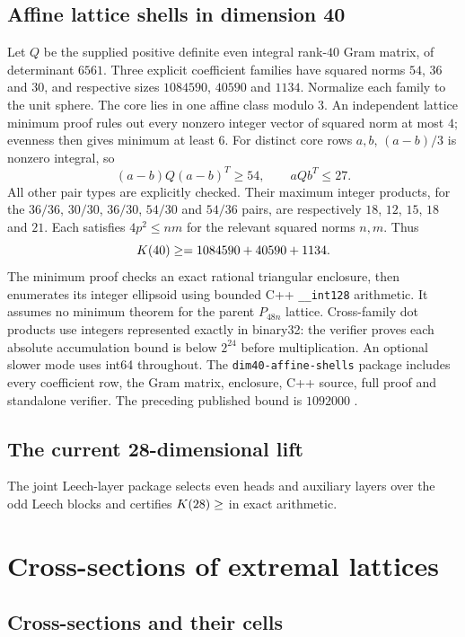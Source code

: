 \documentclass[11pt]{amsart}
\theoremstyle{remark}
\begin{document}
\subsection{Affine lattice shells in dimension 40}\label{ss:d40current}

Let $Q$ be the supplied positive definite even integral rank-$40$ Gram
matrix, of determinant $6561$. Three explicit coefficient families have
squared norms $54$, $36$ and $30$, and respective sizes $1084590$,
$40590$ and $1134$. Normalize each family to the unit sphere. The core
lies in one affine class modulo $3$. An independent lattice minimum proof
rules out every nonzero integer vector of squared norm at most $4$;
evenness then gives minimum at least $6$. For distinct core rows $a,b$,
$(a-b)/3$ is nonzero integral, so
\[
 (a-b)Q(a-b)^T\ge54,\qquad aQb^T\le27.
\]
All other pair types are explicitly checked. Their maximum integer
products, for the $36/36$, $30/30$, $36/30$, $54/30$ and $54/36$ pairs,
are respectively $18$, $12$, $15$, $18$ and $21$. Each satisfies
$4p^2\le nm$ for the relevant squared norms $n,m$. Thus
\[
 K(40)\ge\Kcur{40}=1084590+40590+1134.
\]
The minimum proof checks an exact rational triangular enclosure, then
enumerates its integer ellipsoid using bounded C++ \texttt{\_\_int128}
arithmetic. It assumes no minimum theorem for the parent $P_{48n}$ lattice.
Cross-family dot products use integers represented exactly in binary32:
the verifier proves each absolute accumulation bound is below $2^{24}$
before multiplication. An optional slower mode uses int64 throughout.
The \texttt{dim40-affine-shells} package includes every coefficient row,
the Gram matrix, enclosure, C++ source, full proof and standalone verifier.
The preceding published bound is $1092000$ \cite[Table~2]{dorofeev-sun-wang2026}.

\subsection{The current 28-dimensional lift}\label{ss:d28current}

The joint Leech-layer package selects even heads and auxiliary layers over the
odd Leech blocks and certifies $K(28)\ge\Kcur{28}$ in exact arithmetic.

\section{Cross-sections of extremal lattices}\label{sec:cross}

\subsection{Cross-sections and their cells}
\end{document}
